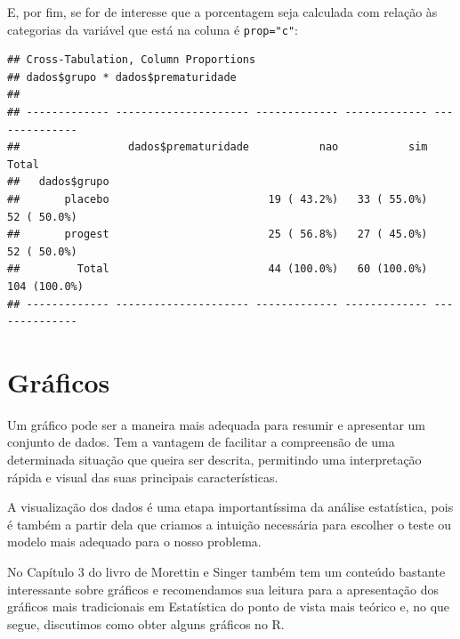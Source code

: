 \documentclass[
]{book}
\newenvironment{Shaded}{\begin{snugshade}}{\end{snugshade}}
\newcommand{\DataTypeTok}[1]{\textcolor[rgb]{0.13,0.29,0.53}{#1}}
\newcommand{\KeywordTok}[1]{\textcolor[rgb]{0.13,0.29,0.53}{\textbf{#1}}}
\newcommand{\NormalTok}[1]{#1}
\newcommand{\OperatorTok}[1]{\textcolor[rgb]{0.81,0.36,0.00}{\textbf{#1}}}
\newcommand{\StringTok}[1]{\textcolor[rgb]{0.31,0.60,0.02}{#1}}
\begin{document}
E, por fim, se for de interesse que a porcentagem seja calculada com relação às categorias da variável que está na coluna é \texttt{prop="c"}:

\begin{Shaded}
\end{Shaded}

\begin{verbatim}
## Cross-Tabulation, Column Proportions  
## dados$grupo * dados$prematuridade  
## 
## ------------- --------------------- ------------- ------------- --------------
##                 dados$prematuridade           nao           sim          Total
##   dados$grupo                                                                 
##       placebo                         19 ( 43.2%)   33 ( 55.0%)    52 ( 50.0%)
##       progest                         25 ( 56.8%)   27 ( 45.0%)    52 ( 50.0%)
##         Total                         44 (100.0%)   60 (100.0%)   104 (100.0%)
## ------------- --------------------- ------------- ------------- --------------
\end{verbatim}

\hypertarget{gruxe1ficos}{%
\section{Gráficos}\label{gruxe1ficos}}

Um gráfico pode ser a maneira mais adequada para resumir e apresentar um conjunto de dados. Tem a vantagem de facilitar a compreensão de uma determinada situação que queira ser descrita, permitindo uma interpretação rápida e visual das suas principais características.

A visualização dos dados é uma etapa importantíssima da análise estatística, pois é também a partir dela que criamos a intuição necessária para escolher o teste ou modelo mais adequado para o nosso problema.

No Capítulo 3 do livro de Morettin e Singer também tem um conteúdo bastante interessante sobre gráficos e recomendamos sua leitura para a apresentação dos gráficos mais tradicionais em Estatística do ponto de vista mais teórico e, no que segue, discutimos como obter alguns gráficos no R.
\end{document}
